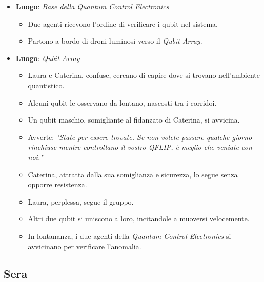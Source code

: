 \begin{itemize}
    \item \textbf{Luogo}: \emph{Base della Quantum Control Electronics}
    \begin{itemize}
        \item Due agenti ricevono l'ordine di verificare i qubit nel sistema.
        \item Partono a bordo di droni luminosi verso il \emph{Qubit Array}.
    \end{itemize}

    \item \textbf{Luogo}: \emph{Qubit Array}
    \begin{itemize}
        \item Laura e Caterina, confuse, cercano di capire dove si trovano nell'ambiente quantistico.
        \item Alcuni qubit le osservano da lontano, nascosti tra i corridoi.
        \item Un qubit maschio, somigliante al fidanzato di Caterina, si avvicina.
        \item Avverte: \emph{"State per essere trovate. Se non volete passare qualche giorno rinchiuse mentre controllano il vostro QFLIP, è meglio che veniate con noi."}
        \item Caterina, attratta dalla sua somiglianza e sicurezza, lo segue senza opporre resistenza.
        \item Laura, perplessa, segue il gruppo.
        \item Altri due qubit si uniscono a loro, incitandole a muoversi velocemente.
        \item In lontananza, i due agenti della \emph{Quantum Control Electronics} si avvicinano per verificare l'anomalia.
    \end{itemize}
\end{itemize}

\subsection*{Sera}

